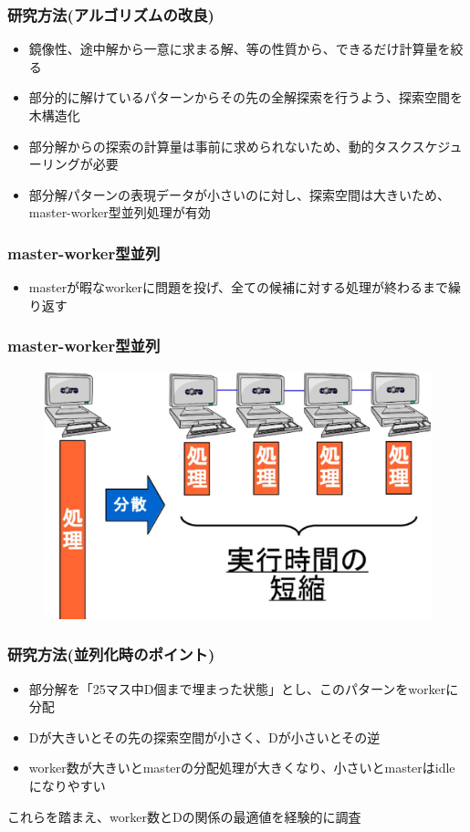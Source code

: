 \documentclass[dvipdfmx,20pt,notheorems,t]{beamer}
\begin{document}
\begin{frame}\frametitle{研究方法(アルゴリズムの改良)}
\begin{itemize}
\item 鏡像性、途中解から一意に求まる解、等の性質から、できるだけ計算量を絞る
\item 部分的に解けているパターンからその先の全解探索を行うよう、探索空間を木構造化
\item 部分解からの探索の計算量は事前に求められないため、動的タスクスケジューリングが必要
\item 部分解パターンの表現データが小さいのに対し、探索空間は大きいため、master-worker型並列処理が有効
\end{itemize}
\end{frame}

\begin{frame}\frametitle{master-worker型並列}
\begin{itemize}
\item masterが暇なworkerに問題を投げ、全ての候補に対する処理が終わるまで繰り返す
\end{itemize}
\end{frame}

\begin{frame}\frametitle{master-worker型並列}
\begin{figure}[htb]
\centering
\includegraphics[width=\textwidth]{master-worker.eps}
\end{figure}
\end{frame}

\begin{frame}\frametitle{研究方法(並列化時のポイント)}
\begin{itemize}
\item 部分解を「25マス中D個まで埋まった状態」とし、このパターンをworkerに分配
\item Dが大きいとその先の探索空間が小さく、Dが小さいとその逆
\item worker数が大きいとmasterの分配処理が大きくなり、小さいとmasterはidleになりやすい
\end{itemize}
これらを踏まえ、worker数とDの関係の最適値を経験的に調査
\end{frame}
\end{document}
